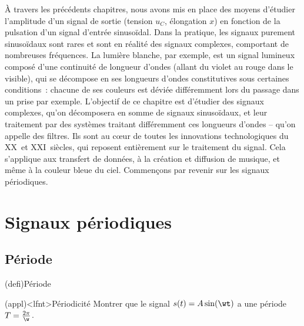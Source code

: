 \documentclass[../../main/main.tex]{subfiles}
\begin{document}
\vfill

\newpage

\vspace*{\fill}
\minitoc
\vspace*{\fill}

À travers les précédents chapitres, nous avons mis en place des moyens d'étudier
l'amplitude d'un signal de sortie (tension $u_C$, élongation $x$) en fonction de
la pulsation d'un signal d'entrée sinusoïdal. Dans la pratique, les signaux
purement sinusoïdaux sont rares et sont en réalité des signaux complexes,
comportant de nombreuses fréquences. La lumière blanche, par exemple, est un
signal lumineux composé d'une continuité de longueur d'ondes (allant du violet
au rouge dans le visible), qui se décompose en ses longueurs d'ondes
constitutives sous certaines conditions~: chacune de ses couleurs est déviée
différemment lors du passage dans un prise par exemple.
\bigbreak
L'objectif de ce chapitre est d'étudier des signaux complexes, qu'on décomposera
en somme de signaux sinusoïdaux, et leur traitement par des systèmes traitant
différemment ces longueurs d'ondes -- qu'on appelle des filtres. Ils sont au
cœur de toutes les innovations technologiques du \textsc{XX}\ieme\ et
\textsc{XXI}\ieme\ siècles, qui reposent entièrement sur le traitement du
signal. Cela s'applique aux transfert de données, à la création et diffusion de
musique, et même à la couleur bleue du ciel. Commençons par revenir sur les
signaux périodiques.


\vspace*{\fill}

\newpage

\section{Signaux périodiques}
\subsection{Période}
\begin{tcb*}(defi){Période}
	\psw{
		\[
			s(t) \quad \text{périodique}
			\Lra
			\exists T~: \forall t \in \Rb^{+}, s(t+T) = s(t)
		\]
	}
	\vspace{-15pt}
\end{tcb*}
\begin{tcb*}(appl)<lfnt>{Périodicité}
	Montrer que le signal $s(t) = A \sin(\wt)$ a une période $T =
		\frac{2\pi}{\w}$.
	\tcblower
	\psw{
		\[
			s \left( t + \frac{2\pi}{\w} \right) =
			A \left( \w \left( t + \frac{2\pi}{\w} \right) \right) =
			A \sin(\wt + 2\pi) = A \sin(\wt)
			\qed
		\]
	}
	\vspace{-15pt}
\end{tcb*}
\end{document}
